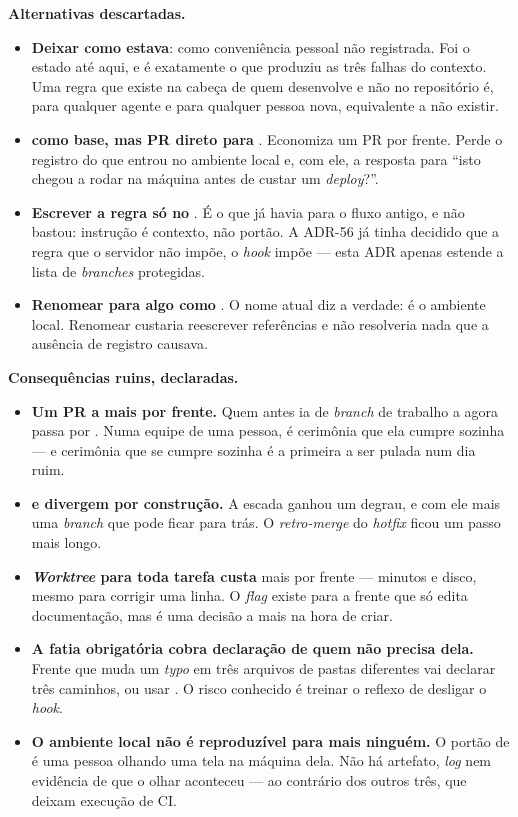 \textbf{Alternativas descartadas.}

\begin{itemize}
  \item \textbf{Deixar como estava}:  como conveniência pessoal
    não registrada. Foi o estado até aqui, e é exatamente o que produziu as três
    falhas do contexto. Uma regra que existe na cabeça de quem desenvolve e não
    no repositório é, para qualquer agente e para qualquer pessoa nova,
    equivalente a não existir.
  \item \textbf{ como base, mas PR direto para }. Economiza
    um PR por frente. Perde o registro do que entrou no ambiente local e, com
    ele, a resposta para \enquote{isto chegou a rodar na máquina antes de custar
    um \emph{deploy}?}.
  \item \textbf{Escrever a regra só no }. É o que já havia para o
    fluxo antigo, e não bastou: instrução é contexto, não portão. A ADR-56 já
    tinha decidido que a regra que o servidor não impõe, o \emph{hook} impõe ---
    esta ADR apenas estende a lista de \emph{branches} protegidas.
  \item \textbf{Renomear  para algo como }. O nome
    atual diz a verdade: é o ambiente local. Renomear custaria reescrever
    referências e não resolveria nada que a ausência de registro causava.
\end{itemize}

\textbf{Consequências ruins, declaradas.}

\begin{itemize}
  \item \textbf{Um PR a mais por frente.} Quem antes ia de \emph{branch} de
    trabalho a  agora passa por . Numa equipe de uma
    pessoa, é cerimônia que ela cumpre sozinha --- e cerimônia que se cumpre
    sozinha é a primeira a ser pulada num dia ruim.
  \item \textbf{ e  divergem por construção.} A escada
    ganhou um degrau, e com ele mais uma \emph{branch} que pode ficar para trás.
    O \emph{retro-merge} do \emph{hotfix} ficou um passo mais longo.
  \item \textbf{\emph{Worktree} para toda tarefa custa}  mais
     por frente --- minutos e disco, mesmo para corrigir uma
    linha. O \emph{flag}  existe para a frente que só edita
    documentação, mas é uma decisão a mais na hora de criar.
  \item \textbf{A fatia obrigatória cobra declaração de quem não precisa dela.}
    Frente que muda um \emph{typo} em três arquivos de pastas diferentes vai
    declarar três caminhos, ou usar . O risco
    conhecido é treinar o reflexo de desligar o \emph{hook}.
  \item \textbf{O ambiente local não é reproduzível para mais ninguém.} O portão
    de  é uma pessoa olhando uma tela na máquina dela. Não há
    artefato, \emph{log} nem evidência de que o olhar aconteceu --- ao contrário
    dos outros três, que deixam execução de CI.
\end{itemize}

